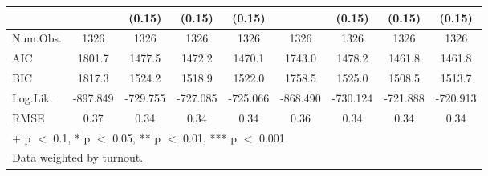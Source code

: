 \begin{table}
\begin{tabular}[t]{lcccccccc}
 &  & (0.15) & (0.15) & (0.15) &  & (0.15) & (0.15) & (0.15)\\
\midrule
Num.Obs. & 1326 & 1326 & 1326 & 1326 & 1326 & 1326 & 1326 & 1326\\
AIC & 1801.7 & 1477.5 & 1472.2 & 1470.1 & 1743.0 & 1478.2 & 1461.8 & 1461.8\\
BIC & 1817.3 & 1524.2 & 1518.9 & 1522.0 & 1758.5 & 1525.0 & 1508.5 & 1513.7\\
Log.Lik. & -897.849 & -729.755 & -727.085 & -725.066 & -868.490 & -730.124 & -721.888 & -720.913\\
RMSE & 0.37 & 0.34 & 0.34 & 0.34 & 0.36 & 0.34 & 0.34 & 0.34\\
\bottomrule
\multicolumn{9}{l}{\rule{0pt}{1em}+ p $<$ 0.1, * p $<$ 0.05, ** p $<$ 0.01, *** p $<$ 0.001}\\
\multicolumn{9}{l}{\rule{0pt}{1em}Data weighted by turnout.}\\
\end{tabular}
\end{table}
